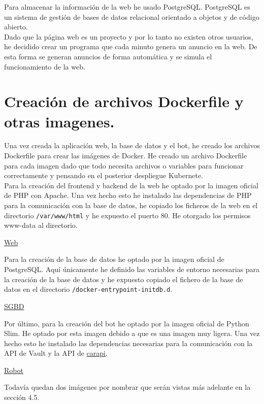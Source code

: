 \documentclass{report}
\begin{document}
            Para almacenar la información de la web he usado PostgreSQL.
            PostgreSQL es un sistema de gestión de bases de datos relacional orientado a objetos y de código abierto.\\

            Dado que la página web es un proyecto y por lo tanto no existen otros usuarios, he decidido crear un programa que cada minuto genera un anuncio en la web.
            De esta forma se generan anuncios de forma automática y se simula el funcionamiento de la web.
        \clearpage
        \section{Creación de archivos Dockerfile y otras imagenes.}
            Una vez creada la aplicación web, la base de datos y el bot, he creado los archivos Dockerfile para crear las imágenes de Docker.
            He creado un archivo Dockerfile para cada imagen dado que todo necesita archivos o variables para funcionar correctamente y pensando en el posterior despliegue Kubernete.\\

            Para la creación del frontend y backend de la web he optado por la imagen oficial de PHP con Apache.
            Una vez hecho esto he instalado las dependencias de PHP para la comunicación con la base de datos, he copiado los ficheros de la web en el directorio \texttt{/var/www/html} y he expuesto el puerto 80.
            He otorgado los permisos www-data al directorio.
            \begin{center}
                \textcolor{Cyan}{\href{https://hub.docker.com/repository/docker/xabierland/web/general}{Web}}
            \end{center}

            Para la creación de la base de datos he optado por la imagen oficial de PostgreSQL.
            Aquí únicamente he definido las variables de entorno necesarias para la creación de la base de datos y he expuesto copiado el fichero de la base de datos en el directorio \texttt{/docker-entrypoint-initdb.d}.
            \begin{center}
                \textcolor{Cyan}{\href{https://hub.docker.com/repository/docker/xabierland/sgbd/general}{SGBD}}
            \end{center}
            Por último, para la creación del bot he optado por la imagen oficial de Python Slim.
            He optado por esta imagen debido a que es una imagen muy ligera.
            Una vez hecho esto he instalado las dependencias necesarias para la comunicación con la API de Vault y la API de \href{https://carapi.app/api#/}{carapi}.
            \begin{center}
                \textcolor{Cyan}{\href{https://hub.docker.com/repository/docker/xabierland/robot/general}{Robot}}
            \end{center}
            Todavía quedan dos imágenes por nombrar que serán vistas más adelante en la sección 4.5.\\
        \clearpage
\end{document}
